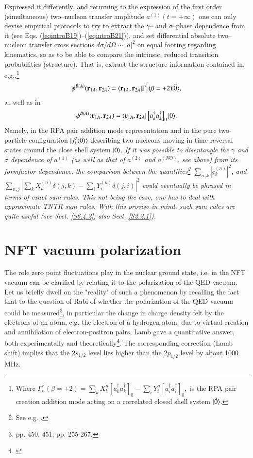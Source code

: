\begin{subappendices}
 
 Expressed it differently, and returning to the expression of the first order (simultaneous) two--nucleon transfer amplitude $a^{(1)}(t=+\infty)$ one can only devise empirical protocols to try to extract the $\gamma$-- and $\sigma$--phase dependence  from it (see Eqs. (\ref{eqintroB19})--(\ref{eqintroB21})), and set differential absolute two--nucleon transfer cross sections $d\sigma/d\Omega\sim |a|^2$ on equal footing regarding kinematics, so as to be able to compare the intrinsic, reduced transition probabilities (structure). That is, extract the structure information contained in, e.g.,\footnote{Where
 	$\Gamma_n^\dagger(\beta=+2)=\sum_k X_k^n\left[a^\dagger_ka^\dagger_k\right]_0-\sum_i Y^n_i \left[a^\dagger_i a^\dagger_i\right]_0,$
 	is the RPA pair creation addition mode acting on  a correlated closed shell system $|{\tilde 0} \rangle$. }
 \begin{align}
 \phi^{B(A)}(\mathbf r_{1A},\mathbf r_{2A})=\langle {\mathbf r_{1A},\mathbf r_{2A}|\Gamma^\dagger_1(\beta=+2)|\tilde 0} \rangle,
 \end{align}
 as well as in
 \begin{align}\label{eq2.D.48}
 \phi^{B(A)}(\mathbf r_{1A},\mathbf r_{2A})=\langle {\mathbf r_{1A},\mathbf r_{2A}}|\left[a^\dagger_ka^\dagger_k\right]_0|{0} \rangle.
 \end{align}
 Namely, in the RPA pair addition mode representation and in the pure two-particle configuration $|{j^2_k(0)} \rangle$ describing two nucleons moving in time reversal states around the close shell system $|{0} \rangle$. \textit{If it was possible to disentangle the $\gamma$ and $\sigma$ dependence of $a^{(1)}$ (as well as that of $a^{(2)}$ and $a^{(NO)}$, see above) from its formfactor dependence, the comparison between the quantities\footnote{See e.g. \cite{Broglia:67}.} $\sum_{n,k}|c^{(n)}_k|^2$, and\\ $\sum_{n,j}\left|\sum_kX^{(n)}_k\delta(j,k)-\sum_iY^{(n)}_i\delta(j,i)\right|^2$ could  eventually be phrased in terms of exact sum rules. This not being  the case, one has to  deal with approximate TNTR sum rules. With this proviso in mind, such sum rules are quite useful (see Sect. \ref{S6.4.2}; also  Sect. \ref{S2.2.1}).} 
 
 
 \section{NFT vacuum polarization}\label{App1.E}
 The role zero point fluctuations play in the nuclear ground state, i.e. in the NFT vacuum  can
 be  clarified by relating it to the polarization of the QED vacuum.
 Let us briefly dwell on the "reality" of such a phenomenon by recalling the fact that
 to the question of Rabi of whether the polarization of the QED vacuum could be measured\footnote{\cite{Pais:86} pp. 450, 451; \cite{Pais:00} pp. 255-267.}, in particular
 the change in charge  density felt by the electrons of an atom,  e.g. the electron of a hydrogen atom, due to
 virtual creation and annihilation of electron-positron pairs,  Lamb gave a quantitative answer, both experimentally
 and theoretically\footnote{\cite{Lamb:47,Kroll:49}}. The corresponding correction  (Lamb shift) implies that the $2s_{1/2}$ level lies 
 higher than the $2p_{1/2}$ level by about 1000 MHz.  
 

\end{subappendices}
